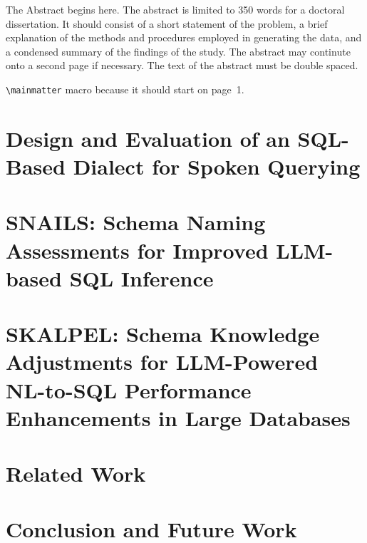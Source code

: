 \documentclass[12pt]{ucsddissertation}
\begin{document}
\begin{dissertationabstract}
The Abstract begins here. The abstract is limited to 350 words for a
doctoral dissertation. It should consist of a short statement of the
problem, a brief explanation of the methods and procedures employed in
generating the data, and a condensed summary of the findings of the
study. The abstract may continute onto a second page if necessary. The
text of the abstract must be double spaced.
\end{dissertationabstract}

\mainmatter

\begin{dissertationintroduction}

\verb!\mainmatter! macro because it should start on page~1.
\end{dissertationintroduction}




\chapter{Design and Evaluation of an SQL-Based Dialect for Spoken Querying}



\chapter{SNAILS: Schema Naming Assessments for Improved LLM-based SQL Inference}



\chapter{SKALPEL: Schema Knowledge Adjustments for LLM-Powered NL-to-SQL Performance Enhancements in Large Databases}



\chapter{Related Work}


\chapter{Conclusion and Future Work}


\appendix

\backmatter

\end{document}
